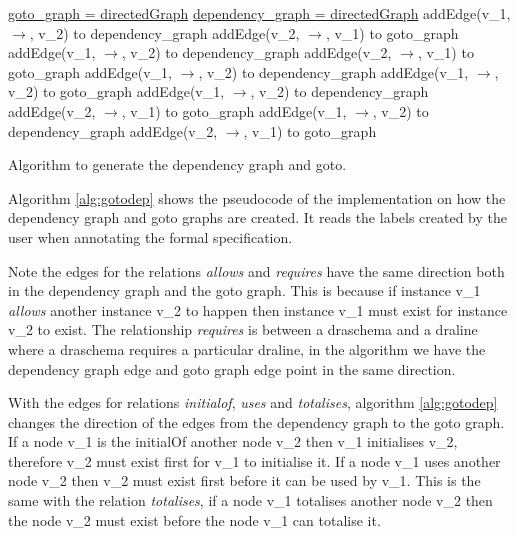 \begin{algorithm}[H] \underline{goto\_graph = directedGraph} \;
\underline{dependency\_graph = directedGraph} \; \SetAlgoLined
{} 
{addEdge(v\_1, $\rightarrow$, v\_2) to dependency\_graph \; addEdge(v\_2,
$\rightarrow$, v\_1)  to goto\_graph\;}
{addEdge(v\_1, $\rightarrow$, v\_2) to dependency\_graph \; addEdge(v\_2,
$\rightarrow$, v\_1)  to goto\_graph \;}
{addEdge(v\_1, $\rightarrow$, v\_2) to dependency\_graph \; addEdge(v\_1,
$\rightarrow$, v\_2)  to goto\_graph \;}
{addEdge(v\_1, $\rightarrow$, v\_2) to dependency\_graph \; addEdge(v\_2,
$\rightarrow$, v\_1)  to goto\_graph \;}
{addEdge(v\_1, $\rightarrow$, v\_2) to dependency\_graph \; addEdge(v\_2,
$\rightarrow$, v\_1)  to goto\_graph \;}
\caption{Algorithm to generate the dependency graph and goto. \label{alg:gotodep} }
\end{algorithm}
\vspace{0.2in}


Algorithm \ref{alg:gotodep} shows the pseudocode of the implementation on how
the dependency graph and goto graphs are created. It reads the labels created by
the user when annotating the formal specification. 

Note the edges for the relations \emph{allows} and \emph{requires} have the same
direction both in the dependency graph and the goto graph. This is because if
instance v\_1 \emph{allows} another instance v\_2 to happen then instance v\_1
must exist for instance v\_2 to exist. The relationship \emph{requires} is
between a draschema and a draline where a draschema requires a particular
draline, in the algorithm we have the dependency graph edge and goto graph edge
point in the same direction.

With the edges for relations \emph{initialof}, \emph{uses} and \emph{totalises},
algorithm \ref{alg:gotodep} changes the direction of the edges from the
dependency graph to the goto graph. If a node v\_1 is the initialOf another node
v\_2 then v\_1 initialises v\_2, therefore v\_2 must exist first for v\_1 to
initialise it. If a node v\_1 uses another node v\_2 then v\_2 must exist first
before it can be used by v\_1. This is the same with the relation
\emph{totalises}, if a node v\_1 totalises another node v\_2 then the node v\_2
must exist before the node v\_1 can totalise it.

